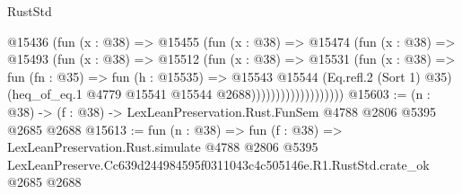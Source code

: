 \begin{lexlean}{RustStd}
\begin{coremodule}
                          @15436
                            (fun (x : @38) =>
                            @15455
                              (fun (x : @38) =>
                              @15474
                                (fun (x : @38) =>
                                @15493
                                  (fun (x : @38) =>
                                  @15512
                                    (fun (x : @38) =>
                                    @15531
                                      (fun (x : @38) =>
                                      fun (fn : @35) =>
                                      fun (h : @15535) =>
                                      @15543
                                        @15544
                                        (Eq.refl.{2} (Sort 1) @35)
                                        (heq_of_eq.{1} @4779 @15541 @15544 @2688)))))))))))))))))))
@15603 := (n : @38) -> (f : @38) -> LexLeanPreservation.Rust.FunSem @4788 @2806 @5395 @2685 @2688
@15613 := fun (n : @38) =>
  fun (f : @38) =>
  LexLeanPreservation.Rust.simulate
    @4788
    @2806
    @5395
    LexLeanPreserve.Cc639d244984595f0311043c4c505146e.R1.RustStd.crate_ok
    @2685
    @2688
\end{coremodule}
\end{lexlean}

